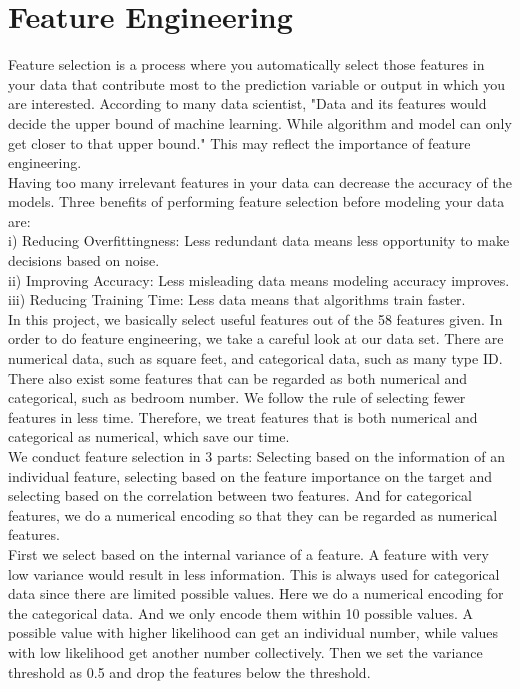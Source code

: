 \documentclass[conference]{IEEEtran}
\begin{document}
\section{Feature Engineering}\label{iv}
\indent Feature selection is a process where you automatically select those features in your data that contribute most to the prediction variable or output in which you are interested. According to many data scientist, "Data and its features would decide the upper bound of machine learning. While algorithm and model can only get closer to that upper bound." This may reflect the importance of feature engineering.\\
\indent Having too many irrelevant features in your data can decrease the accuracy of the models. Three benefits of performing feature selection before modeling your data are: \\
\indent i) Reducing Overfittingness: Less redundant data means less opportunity to make decisions based on noise. \\ 
\indent ii) Improving Accuracy: Less misleading data means modeling accuracy improves. \\
\indent iii) Reducing Training Time: Less data means that algorithms train faster. \\
\indent In this project, we basically select useful features out of the 58 features given. In order to do feature engineering, we take a careful look at our data set. There are numerical data, such as square feet,  and categorical data, such as many type ID. There also exist some features that can be regarded as both numerical and categorical, such as bedroom number. We follow the rule of selecting fewer features in less time. Therefore, we treat features that is both numerical and categorical as numerical, which save our time. \\
\indent We conduct feature selection in 3 parts: Selecting based on the information of an individual feature, selecting based on the feature importance on the target and selecting based on the correlation between two features.  And for categorical features, we do a numerical encoding so that they can be regarded as numerical features. \\
\indent First we select based on the internal variance of a feature. A feature with very low variance would result in less information. This is always used for categorical data since there are limited possible values. Here we do a numerical encoding for the categorical data. And we only encode them within 10 possible values. A possible value with higher likelihood can get an individual number, while values with low likelihood get another number collectively. Then we set the variance threshold as 0.5 and drop the features below the threshold. \\
\end{document}

